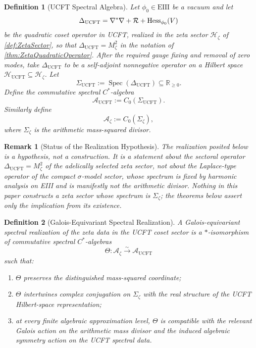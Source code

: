 \documentclass[pdflatex,sn-mathphys-num]{sn-jnl}
\theoremstyle{thmstyleone}
\theoremstyle{thmstylethree}%
\newtheorem{definition}[definition]{Definition}
\theoremstyle{thmstyletwo}%
\newtheorem{remark}[remark]{Remark}
\begin{document}
\begin{definition}[UCFT Spectral Algebra]
\label{def:UCFTSpectralAlgebra}
Let \(\phi_{0}\in \mathrm{EIII}\) be a vacuum and let
\[
\Delta_{\mathrm{UCFT}}
=
\nabla^{*}\nabla+\mathcal R+\operatorname{Hess}_{\phi_{0}}(V)
\]
be the quadratic coset operator in UCFT, realized in the zeta sector
\(\mathcal H_\zeta\) of \autoref{def:ZetaSector}, so that
\(\Delta_{\mathrm{UCFT}}=M_\zeta^{2}\) in the notation of
\autoref{thm:ZetaQuadraticOperator}.
After the required gauge fixing and removal of zero modes, take
\(\Delta_{\mathrm{UCFT}}\) to be a self-adjoint nonnegative operator on a
Hilbert space \(\mathcal H_{\mathrm{UCFT}}\subseteq\mathcal H_\zeta\). Let
\[
\Sigma_{\mathrm{UCFT}}
:=
\operatorname{Spec}(\Delta_{\mathrm{UCFT}})
\subseteq \mathbb R_{\ge0}.
\]
Define the commutative spectral \(C^{*}\)-algebra
\[
\mathcal A_{\mathrm{UCFT}}
:=
C_{0}(\Sigma_{\mathrm{UCFT}}).
\]
Similarly define
\[
\mathcal A_{\zeta}
:=
C_{0}(\Sigma_{\zeta}),
\]
where \(\Sigma_{\zeta}\) is the arithmetic mass-squared divisor.
\end{definition}

\begin{remark}[Status of the Realization Hypothesis]
\label{rmk:RealizationStatus}
The realization posited below is a hypothesis, not a construction. It is a
statement about the sectoral operator \(\Delta_{\mathrm{UCFT}}=M_\zeta^{2}\)
of the adelically selected zeta sector, not about the Laplace-type operator of
the compact $\sigma$-model sector, whose spectrum is fixed by harmonic
analysis on EIII and is manifestly not the arithmetic divisor. Nothing in
this paper constructs a zeta sector whose spectrum is \(\Sigma_\zeta\);
the theorems below assert only the implication from its existence.
\end{remark}

\begin{definition}[Galois-Equivariant Spectral Realization]
\label{def:GaloisRealization}
A Galois-equivariant spectral realization of the zeta data in the UCFT coset
sector is a \(*\)-isomorphism of commutative spectral \(C^{*}\)-algebras
\[
\Theta:\mathcal A_{\zeta}\xrightarrow{\sim}\mathcal A_{\mathrm{UCFT}}
\]
such that:
\begin{enumerate}
\item \(\Theta\) preserves the distinguished mass-squared coordinate;
\item \(\Theta\) intertwines complex conjugation on \(\Sigma_{\zeta}\) with the
real structure of the UCFT Hilbert-space representation;
\item at every finite algebraic approximation level, \(\Theta\) is compatible
with the relevant Galois action on the arithmetic mass divisor and the induced
algebraic symmetry action on the UCFT spectral data.
\end{enumerate}
\end{definition}
\end{document}

